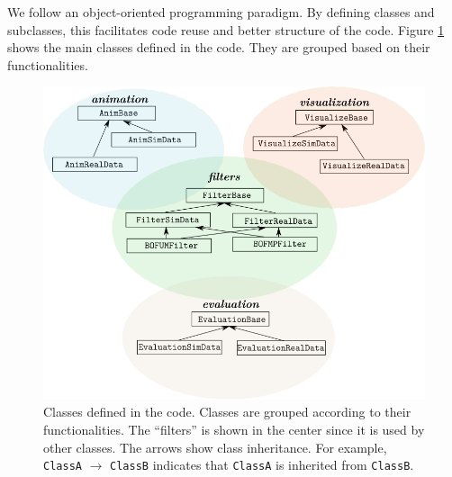 We follow an object-oriented programming paradigm. By defining classes and subclasses, this facilitates code reuse and better structure of the code. Figure \ref{fig:classes} shows the main classes defined in the code. They are grouped based on their functionalities. 

\begin{figure}[hp]
  \centering
    \includegraphics[width=\textwidth]{figures/classes.png}
    \caption[Classes defined in the code.]{Classes defined in the code. Classes are grouped according to their functionalities. The ``filters'' is shown in the center since it is used by other classes. The arrows show class inheritance. For example, \texttt{ClassA} $\rightarrow$ \texttt{ClassB} indicates that \texttt{ClassA} is inherited from \texttt{ClassB}. }
    \label{fig:classes}
\end{figure}

